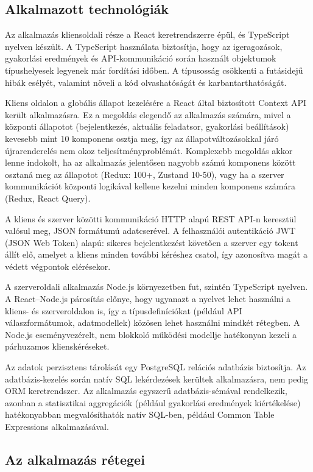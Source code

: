 \documentclass[12pt,a4paper]{report}
\begin{document}
\subsection{Alkalmazott technológiák}

Az alkalmazás kliensoldali része a React keretrendszerre épül, és TypeScript nyelven készült. A TypeScript használata biztosítja, hogy az igeragozások, gyakorlási eredmények és API-kommunikáció során használt objektumok típushelyesek legyenek már fordítási időben. A típusosság csökkenti a futásidejű hibák esélyét, valamint növeli a kód olvashatóságát és karbantarthatóságát.

Kliens oldalon a globális állapot kezelésére a React által biztosított Context API került alkalmazásra. Ez a megoldás elegendő az alkalmazás számára, mivel a központi állapotot (bejelentkezés, aktuális feladatsor, gyakorlási beállítások) kevesebb mint 10 komponens osztja meg, így az állapotváltozásokkal járó újrarenderelés nem okoz teljesítményproblémát. Komplexebb megoldás akkor lenne indokolt, ha az alkalmazás jelentősen nagyobb számú komponens között osztaná meg az állapotot (Redux: 100+, Zustand 10-50), vagy ha a szerver kommunikációt központi logikával kellene kezelni minden komponens számára (Redux, React Query).

A kliens és szerver közötti kommunikáció HTTP alapú REST API-n keresztül valósul meg, JSON formátumú adatcserével. A felhasználói autentikáció JWT (JSON Web Token) alapú: sikeres bejelentkezést követően a szerver egy tokent állít elő, amelyet a kliens minden további kéréshez csatol, így azonosítva magát a védett végpontok elérésekor.

A szerveroldali alkalmazás Node.js környezetben fut, szintén TypeScript nyelven. A React--Node.js párosítás előnye, hogy ugyanazt a nyelvet lehet használni a kliens- és szerveroldalon is, így a típusdefiníciókat (például API válaszformátumok, adatmodellek) közösen lehet használni mindkét rétegben. A Node.js eseményvezérelt, nem blokkoló működési modellje hatékonyan kezeli a párhuzamos klienskéréseket.

Az adatok perzisztens tárolását egy PostgreSQL relációs adatbázis biztosítja. Az adatbázis-kezelés során natív SQL lekérdezések kerültek alkalmazásra, nem pedig ORM keretrendszer. Az alkalmazás egyszerű adatbázis-sémával rendelkezik, azonban a statisztikai aggregációk (például gyakorlási eredmények kiértékelése) hatékonyabban megvalósíthatók natív SQL-ben, például Common Table Expressions alkalmazásával.

\subsection{Az alkalmazás rétegei}
\end{document}
